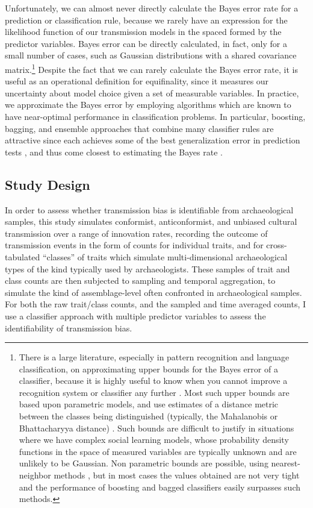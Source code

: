 \documentclass[10pt,letterpaper]{article}
\begin{document}
Unfortunately, we can almost never directly calculate the Bayes error
rate for a prediction or classification rule, because we rarely have an
expression for the likelihood function of our transmission models in the
spaced formed by the predictor variables. Bayes error can be directly calculated, in fact, only for
a small number of cases, such as Gaussian distributions with a shared
covariance
matrix.\footnote{There is a large literature, especially in pattern recognition and language classification, on approximating upper bounds for the Bayes error of a classifier, because it is highly useful to know when you cannot improve a recognition system or classifier any further \cite{Antos:1999dn, Dobbin:2009du, McLachlan:1975eo}.  Most such upper bounds are based upon parametric models, and use estimates of a distance metric between the classes being distinguished (typically, the Mahalanobis or Bhattacharyya distance) \cite{devijver1982pattern}.  Such bounds are difficult to justify in situations where we have complex social learning models, whose probability density functions in the space of measured variables are typically unknown and are unlikely to be Gaussian.  Non parametric bounds are possible, using nearest-neighbor methods \cite{Loizou:1987bi}, but in most cases the values obtained are not very tight and the performance of boosting and bagged classifiers easily surpasses such methods.}
Despite the fact that we can rarely calculate the Bayes error rate, it
is useful as an operational definition for equifinality, since it
measures our uncertainty about model choice given a set of measurable
variables. In practice, we approximate the Bayes error by employing
algorithms which are known to have near-optimal performance in
classification problems. In particular, boosting, bagging, and ensemble
approaches that combine many classifier rules are attractive since each
achieves some of the best generalization error in prediction tests
\cite{hastie2009elements}, and thus come closest to estimating the
Bayes rate \cite{tumer2003bayes}.  


\subsection{Study Design}\label{model-comparisons}

In order to assess whether transmission bias is identifiable from archaeological samples, this study simulates conformist, anticonformist, and unbiased cultural transmission over a range of innovation rates, recording the outcome of transmission events in the form of counts for individual traits, and for cross-tabulated ``classes'' of traits which simulate multi-dimensional archaeological types of the kind typically used by archaeologists.  These samples of trait and class counts are then subjected to sampling and temporal aggregation, to simulate the kind of assemblage-level often confronted in archaeological samples.  For both the raw trait/class counts, and the sampled and time averaged counts, I use a classifier approach with multiple predictor variables to assess the identifiability of transmission bias.    
\end{document}
